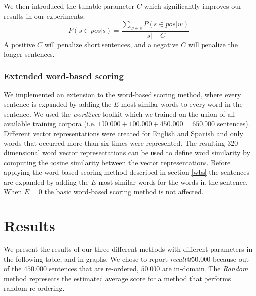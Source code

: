 \documentclass[11pt]{article}
\begin{document}
We then introduced the tunable parameter $C$ which significantly improves our results in our experiments:
\begin{equation} P(s\in pos | s)  = \frac{\sum_{w\in s} P(s\in pos | w)}{ | s | + C}  \end{equation}
A positive $C$ will penalize short sentences, and a negative $C$ will penalize the longer sentences.


\subsubsection{Extended word-based scoring}
We implemented an extension to the word-based scoring method, where every sentence is expanded by adding the $E$ most similar words to every word in the sentence. We used the \textit{word2vec} toolkit \cite{word2vec} which we trained on the union of all available training corpora (i.e. $100.000 + 100.000 + 450.000 = 650.000$ sentences). Different vector representations were created for English and Spanish and only words that occurred more than six times were represented. The resulting 320-dimensional word vector representations can be used to define word similarity by computing the cosine similarity between the vector representations. 
Before applying the word-based scoring method described in section \ref{wbs} the sentences are expanded by adding the $E$ most similar words for the words in the sentence. When $E=0$ the basic word-based scoring method is not affected.

\section{Results}
\label{sec:results}
We present the results of our three different methods with different parameters in the following table, and in graphs. We chose to report \textit{recall@}$50.000$ because out of the $450.000$ sentences that are re-ordered, $50.000$ are in-domain. The \textit{Random} method represents the estimated average score for a method that performs random re-ordering.
\end{document}
